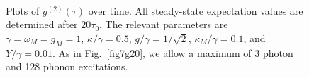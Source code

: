 \begin{figure}[htb]
\centering
{}
\qquad
{}
\\
\caption[Plots of $g^{(2)}(\tau)$ ]{\small{Plots of $g^{(2)}(\tau)$ over time. All steady-state expectation values are determined after $20\tau_0$. The relevant parameters are $\gamma = \omega_M = g_M = 1$, $\kappa/\gamma = 0.5$, $g/\gamma = 1/\sqrt{2}$, $\kappa_M/\gamma = 0.1$, and $Y/\gamma = 0.01$. As in Fig.~\ref{fig7g20}, we allow a maximum of 3 photon and 128 phonon excitations.}}
\label{fig8g2tau}
\end{figure}

